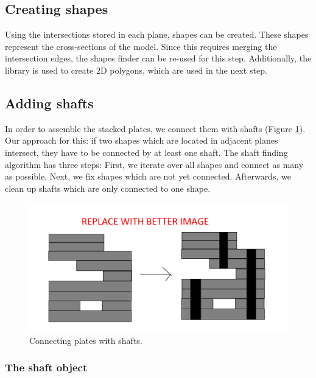 \documentclass[../ClassicThesis.tex]{subfiles}
\begin{document}
\subsection{Creating shapes}

Using the intersections stored in each plane, shapes can be created. These shapes represent the cross-sections of the model. Since this requires merging the intersection edges, the shapes finder can be re-used for this step. Additionally, the \jsclipper library is used to create 2D polygons, which are used in the next step.

\subsection{Adding shafts}

In order to assemble the stacked plates, we connect them with shafts (Figure \ref{fig:shafts}). Our approach for this: if two shapes which are located in adjacent planes intersect, they have to be connected by at least one shaft. The shaft finding algorithm has three steps: First, we iterate over all shapes and connect as many as possible. Next, we fix shapes which are not yet connected. Afterwards, we clean up shafts which are only connected to one shape.

\begin{figure}
    \centering
    \includegraphics[width=1.0\columnwidth]{Images/plates_shafts.png}
    \caption{Connecting plates with shafts.}
    \label{fig:shafts}
\end{figure}

\subsubsection{The shaft object}
\end{document}

